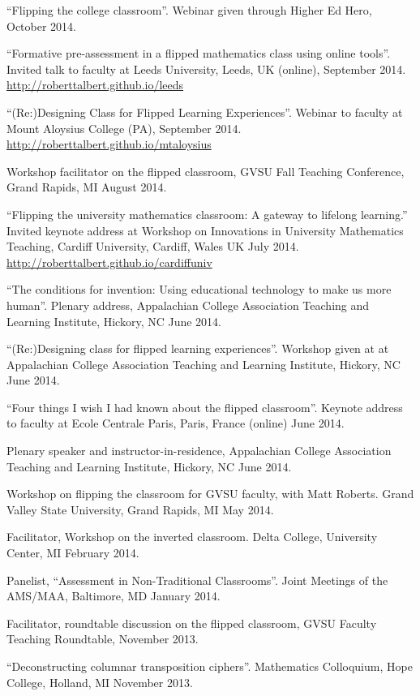 \documentclass[letterpaper]{article}
\renewenvironment{itemize}{
  \begin{list}{}{
    \setlength{\leftmargin}{1.5em}
	\setlength{\itemsep}{0in}
  }
}{
  \end{list}
}
\begin{document}
\begin{itemize}
	\item ``Flipping the college classroom''. Webinar given through Higher Ed Hero, October 2014.
	\item ``Formative pre-assessment in a flipped mathematics class using online tools''. Invited talk to faculty at Leeds University, Leeds, UK (online), September 2014. \url{http://roberttalbert.github.io/leeds}
	\item ``(Re:)Designing Class for Flipped Learning Experiences''. Webinar to faculty at Mount Aloysius College (PA), September 2014. \url{http://roberttalbert.github.io/mtaloysius}
	\item Workshop facilitator on the flipped classroom, GVSU Fall Teaching Conference, Grand Rapids, MI August 2014.
	\item ``Flipping the university mathematics classroom: A gateway to lifelong learning.'' Invited keynote address at Workshop on Innovations in University Mathematics Teaching, Cardiff University, Cardiff, Wales UK July 2014. \url{http://roberttalbert.github.io/cardiffuniv}
	\item ``The conditions for invention: Using educational technology to make us more human''. Plenary address, Appalachian College Association Teaching and Learning Institute, Hickory, NC June 2014.
	\item ``(Re:)Designing class for flipped learning experiences''.  Workshop given at at Appalachian College Association Teaching and Learning Institute, Hickory, NC June 2014.
	\item ``Four things I wish I had known about the flipped classroom''. Keynote address to faculty at Ecole Centrale Paris, Paris, France (online) June 2014.
	\item Plenary speaker and instructor-in-residence, Appalachian College Association Teaching and Learning Institute, Hickory, NC June 2014.
	\item Workshop on flipping the classroom for GVSU faculty, with Matt Roberts. Grand Valley State University, Grand Rapids, MI May 2014.
	\item Facilitator, Workshop on the inverted classroom. Delta College, University Center, MI February 2014.
	\item Panelist, ``Assessment in Non-Traditional Classrooms''. Joint Meetings of the AMS/MAA, Baltimore, MD January 2014.
	\item Facilitator, roundtable discussion on the flipped classroom, GVSU Faculty Teaching Roundtable, November 2013.
	\item ``Deconstructing columnar transposition ciphers''. Mathematics Colloquium, Hope College, Holland, MI November 2013.

\end{itemize}
\end{document}
